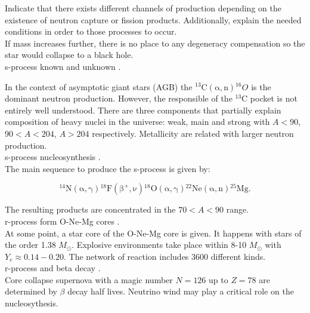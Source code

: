 \documentclass[openany]{book}
\begin{document}
Indicate that there exists different channels of production depending on the existence of neutron capture or fission products. Additionally, explain the needed conditions in order to those processes to occur. \\ 

If mass increases further, there is no place to any degeneracy compensation so the star would collapse to a black hole. \\

s-process known and unknown \cite{lattanzio_lugaro_2005}.

In the context of asymptotic giant stars (AGB) the $\mathrm{{}^{13}C(\alpha, n)}{}^{16}O$ is the dominant neutron production. However, the responsible of the $\mathrm{{}^{13}C}$ pocket is not entirely well understood. There are three components that partially explain composition of heavy nuclei in the universe: weak, main and strong with $A<90$, $90<A<204$, $A>204$ respectively. Metallicity are related with larger neutron production. \\

s-process nucleosynthesis \cite{kappeler_2005}. \\

The main sequence to produce the s-process is given by: 

\begin{equation}\label{eq:reaction_sprocess_source}
	\mathrm{{}^{14}N(\alpha, \gamma) {}^{18}F(\beta^+, \nu) {}^{18}O(\alpha, \gamma) {}^{22}Ne(\alpha, n) {}^{25}Mg}.
\end{equation}

The resulting products are concentrated in the $70 < A < 90$ range. \\

r-process form O-Ne-Mg cores \cite{wanajo_tamamura_itoh_nomoto_ishimaru_beers_nozawa_2003}. \\

At some point, a star core of the O-Ne-Mg core is given. It happens with stars of the order 1.38 $M_{\odot}$. Explosive environments take place within 8-10 $M_{\odot}$ with $Y_e \approx 0.14-0.20$. The network of reaction includes 3600 different kinds. \\

r-process and beta decay \cite{suzuki_shibagaki_yoshida_kajino_otsuka_2018}. \\

Core collapse supernova with a magic number $N = 126$ up to $Z = 78$ are determined by $\beta$ decay half lives. Neutrino wind may play a critical role on the nucleosythesis. \\
\end{document}
